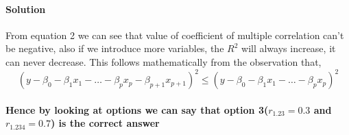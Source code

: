 \documentclass{article}
\begin{document}
\paragraph{Solution}
 From equation 2 we can see that value of coefficient of multiple correlation can't be negative, also if we introduce more variables, the \(R^2\) will always increase, it can never decrease. This follows mathematically from the observation that,\\
\begin{equation}
    (y - \beta_0 - \beta_1x_1 - \dots - \beta_px_p - \beta_{p+1}x_{p+1})^2 \leq (y - \beta_0 - \beta_1x_1 - \dots - \beta_px_p)^2
\end{equation}
\\
\textbf{Hence by looking at options we can say that option 3(\(r_{1.23} = 0.3\) and \(r_{1.234} = 0.7\)) is the correct answer}
\end{document}
